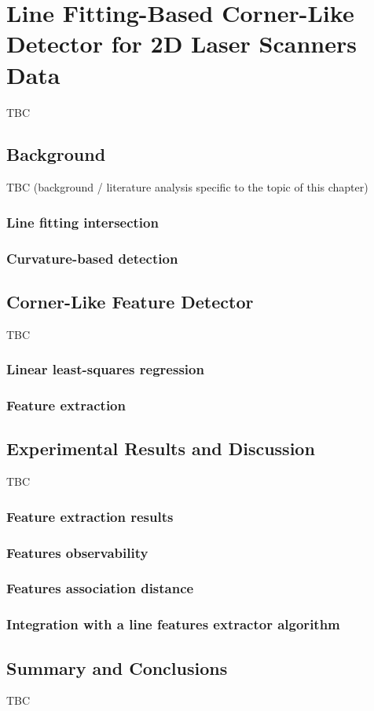 \chapter{Line Fitting-Based Corner-Like Detector for 2D Laser Scanners Data}\label{chap:features}

TBC

\section{Background}\label{sec:features:background}

TBC (background / literature analysis specific to the topic of this chapter)

\subsection{Line fitting intersection}
\subsection{Curvature-based detection}

\section{Corner-Like Feature Detector}

TBC

\subsection{Linear least-squares regression}
\subsection{Feature extraction}

\section{Experimental Results and Discussion}\label{sec:features:results}

TBC

\subsection{Feature extraction results}
\subsection{Features observability}
\subsection{Features association distance}
\subsection{Integration with a line features extractor algorithm}

\section{Summary and Conclusions}\label{sec:features:conclusions}

TBC
